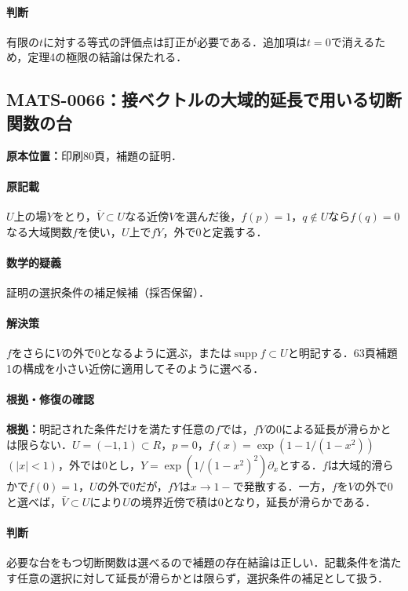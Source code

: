 \documentclass[a4paper,10pt]{ltjsarticle}
\begin{document}
\paragraph{判断}有限の$t$に対する等式の評価点は訂正が必要である．追加項は$t=0$で消えるため，定理4の極限の結論は保たれる．


\subsection*{MATS-0066：接ベクトルの大域的延長で用いる切断関数の台}\label{math:MATS-0066}
\noindent\textbf{原本位置：}印刷80頁，補題の証明．

\paragraph{原記載}$U$上の場$Y$をとり，$\bar V\subset U$なる近傍$V$を選んだ後，$f(p)=1$，$q\notin U$なら$f(q)=0$なる大域関数$f$を使い，$U$上で$fY$，外で0と定義する．

\paragraph{数学的疑義}証明の選択条件の補足候補（採否保留）．

\paragraph{解決策}$f$をさらに$V$の外で0となるように選ぶ，または$\operatorname{supp}f\subset U$と明記する．63頁補題1の構成を小さい近傍に適用してそのように選べる．

\paragraph{根拠・修復の確認}\textbf{根拠：}明記された条件だけを満たす任意の$f$では，$fY$の0による延長が滑らかとは限らない．$U=(-1,1)\subset R$，$p=0$，$f(x)=\exp(1-1/(1-x^2))$ $(|x|<1)$，外では0とし，$Y=\exp(1/(1-x^2)^2)\partial_x$とする．$f$は大域的滑らかで$f(0)=1$，$U$の外で0だが，$fY$は$x\to1-$で発散する．一方，$f$を$V$の外で0と選べば，$\bar V\subset U$により$U$の境界近傍で積は0となり，延長が滑らかである．

\paragraph{判断}必要な台をもつ切断関数は選べるので補題の存在結論は正しい．記載条件を満たす任意の選択に対して延長が滑らかとは限らず，選択条件の補足として扱う．
\end{document}
